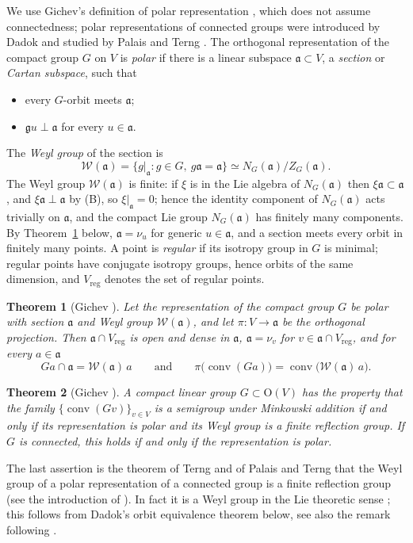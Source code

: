 \documentclass[11pt]{amsart}
\theoremstyle{plain}
\newtheorem{theorem}{Theorem}[section]
\theoremstyle{definition}
\theoremstyle{remark}
\newcommand{\fg}{\mathfrak g}
\newcommand{\fa}{\mathfrak a}
\newcommand{\conv}{\operatorname{conv}}
\newcommand{\reg}{\mathrm{reg}}
\begin{document}
We use Gichev's definition of polar representation \cite{Gichev}, which does not assume connectedness; polar representations of connected groups were introduced by Dadok \cite{Dadok} and studied by Palais and Terng \cite{PT}. The orthogonal representation of the compact group $G$ on $V$ is \emph{polar} if there is a linear subspace $\fa\subset V$, a \emph{section} or \emph{Cartan subspace}, such that
\begin{itemize}
\item[(A)] every $G$-orbit meets $\fa$;
\item[(B)] $\fg u\perp\fa$ for every $u\in\fa$.
\end{itemize}
The \emph{Weyl group} of the section is
\[
\mathcal W(\fa)=\{g|_\fa: g\in G,\ g\fa=\fa\}\simeq N_G(\fa)/Z_G(\fa).
\]
The Weyl group $\mathcal W(\fa)$ is finite: if $\xi$ is in the Lie algebra of $N_G(\fa)$ then $\xi\fa\subset\fa$, and $\xi\fa\perp\fa$ by (B), so $\xi|_\fa=0$; hence the identity component of $N_G(\fa)$ acts trivially on $\fa$, and the compact Lie group $N_G(\fa)$ has finitely many components. By Theorem~\ref{thm:gichev-prop} below, $\fa=\nu_u$ for generic $u\in\fa$, and a section meets every orbit in finitely many points. A point is \emph{regular} if its isotropy group in $G$ is minimal; regular points have conjugate isotropy groups, hence orbits of the same dimension, and $V_\reg$ denotes the set of regular points.

\begin{theorem}[Gichev {\cite[Proposition 2]{Gichev}}]\label{thm:gichev-prop}
Let the representation of the compact group $G$ be polar with section $\fa$ and Weyl group $\mathcal W(\fa)$, and let $\pi:V\to\fa$ be the orthogonal projection. Then $\fa\cap V_\reg$ is open and dense in $\fa$, $\fa=\nu_v$ for $v\in\fa\cap V_\reg$, and for every $a\in\fa$
\[
Ga\cap\fa=\mathcal W(\fa)\,a\qquad\text{and}\qquad \pi\big(\conv(Ga)\big)=\conv\big(\mathcal W(\fa)\,a\big).
\]
\end{theorem}

\begin{theorem}[Gichev {\cite[Theorem 1]{Gichev}}]\label{thm:gichev-SP}
A compact linear group $G\subset \mathrm{O}(V)$ has the property that the family $\{\conv(Gv)\}_{v\in V}$ is a semigroup under Minkowski addition if and only if its representation is polar and its Weyl group is a finite reflection group. If $G$ is connected, this holds if and only if the representation is polar.
\end{theorem}

The last assertion is the theorem of Terng and of Palais and Terng that the Weyl group of a polar representation of a connected group is a finite reflection group (see the introduction of \cite{Gichev}). In fact it is a Weyl group in the Lie theoretic sense \cite[Corollary 4.7]{PT}; this follows from Dadok's orbit equivalence theorem below, see also the remark following \cite[Proposition~6]{Dadok}.
\end{document}
